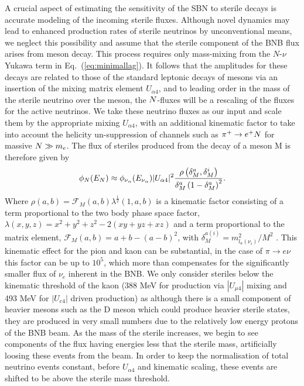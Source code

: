 \documentclass[11pt, a4paper]{article}
\newcommand{\refeq}[1]{Eq.~(\ref{#1})}
\def\ster{\ensuremath N}
\begin{document}
A crucial aspect of estimating the sensitivity of the SBN to sterile decays is
accurate modeling of the incoming sterile fluxes. 
%
Although novel dynamics may lead to enhanced production rates of sterile
neutrinos by unconventional means, we neglect this possibility and assume that
the sterile component of the BNB flux arises from meson decay. This process
requires only mass-mixing from the $N$-$\nu$ Yukawa term in
\refeq{eq:minimallag}. It follows that the amplitudes for these decays are
related to those of the standard leptonic decays of mesons via an insertion of
the mixing matrix element $U_{\alpha 4}$, and to leading order in the mass of
the sterile neutrino over the meson, the $\ster$-fluxes will be a rescaling of
the fluxes for the active neutrinos. We take these neutrino fluxes as our
input and scale them by the appropriate mixing $U_{\alpha 4}$, with an
additional kinematic factor to take into account the helicity un-suppression of
channels such as $\pi^+ \rightarrow e^+\ster$ for massive $\ster \gg m_e$. The
flux of steriles produced from the decay of a meson M is therefore given by
%
\[ \phi_{\ster}(E_{\ster}) \approx \phi_{\nu_\alpha} (E_{\nu_\alpha})\vert
U_{\alpha 4}\vert^2 \frac{\rho\left( \delta_M^a , \delta_M^i
\right)}{\delta_M^a \left(1- \delta_M^a\right)^2}.  \]
%
Where $\rho(a,b)=\mathcal{F}_M(a,b) \lambda^{\frac{1}{2}}(1,a,b)$ is a
kinematic factor consisting of a term proportional to the two body phase space
factor, $\lambda(x,y,z)=x^2+y^2+z^2-2(x y+yz+x z)$ and a term proportional to
the matrix element, $\mathcal{F}_M(a,b)= a+b -\left(a-b\right)^2$, with
$\delta_M^{a(i)}=m_{l_a(\nu_i)}^2/M^2$ \cite{PhysRevD.24.1232}. This kinematic
effect for the pion and kaon can be substantial, in the case of $\pi
\rightarrow e \nu$ this factor can be up to $10^5$, which more than compensates
for the significantly smaller flux of $\nu_e$  inherent in the BNB. We only
consider steriles below the kinematic threshold of the kaon (388 MeV for
production via $|U_{\mu4}|$ mixing and 493 MeV for $|U_{e4}|$ driven
production) as although there is a small component of heavier mesons such as
the D meson which could produce heavier sterile states, they are produced in
very small numbers due to the relatively low energy protons of the BNB beam. As
the mass of the sterile increases, we begin to see components of the flux
having energies less that the sterile mass, artificially loosing these events
from the beam. In order to keep the normalisation of total neutrino events
constant, before $U_{\alpha 4}$ and kinematic scaling, these events are shifted
to be above the sterile mass threshold.
\end{document}
